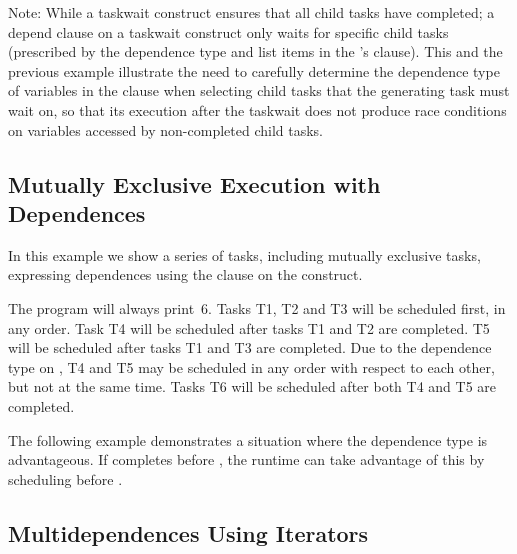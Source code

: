 Note: While a taskwait construct ensures that all child tasks have completed; a depend clause on a taskwait
construct only waits for specific child tasks (prescribed by the dependence type and list
items in the 's  clause).
This and the previous example illustrate the need to carefully determine
the dependence type of variables in the   clause
when selecting child tasks that the generating task must wait on, so that its execution after the
taskwait does not produce race conditions on variables accessed by non-completed child tasks.



\pagebreak
\subsection{Mutually Exclusive Execution with Dependences}
\label{subsec:task_dep_mutexinoutset}

In this example we show a series of tasks, including mutually exclusive
tasks, expressing dependences using the  clause on the
 construct.

The program will always print~6. Tasks T1, T2 and T3 will be scheduled first,
in any order. Task T4 will be scheduled after tasks T1 and T2 are
completed. T5 will be scheduled after tasks T1 and T3 are completed. Due
to the  dependence type on , T4 and T5 may be
scheduled in any order with respect to each other, but not at the same
time. Tasks T6 will be scheduled after both T4 and T5 are completed.



The following example demonstrates a situation where the 
dependence type is advantageous. If  completes
before , the runtime can take advantage of this by
scheduling  before .



\subsection{Multidependences Using Iterators}
\label{subsec:depend_iterator}

